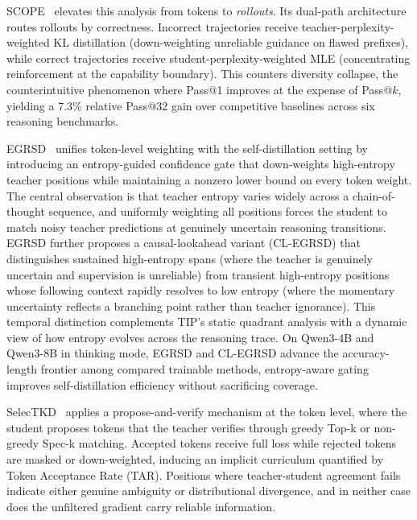 \documentclass{article} %
\begin{document}
SCOPE~\citep{2604.10688} elevates this analysis from tokens to \emph{rollouts}. Its dual-path architecture routes rollouts by correctness. Incorrect trajectories receive teacher-perplexity-weighted KL distillation (down-weighting unreliable guidance on flawed prefixes), while correct trajectories receive student-perplexity-weighted MLE (concentrating reinforcement at the capability boundary). This counters diversity collapse, the counterintuitive phenomenon where Pass@1 improves at the expense of Pass@$k$, yielding a 7.3\% relative Pass@32 gain over competitive baselines across six reasoning benchmarks.

EGRSD~\citep{2605.13255} unifies token-level weighting with the self-distillation setting by introducing an entropy-guided confidence gate that down-weights high-entropy teacher positions while maintaining a nonzero lower bound on every token weight. The central observation is that teacher entropy varies widely across a chain-of-thought sequence, and uniformly weighting all positions forces the student to match noisy teacher predictions at genuinely uncertain reasoning transitions. EGRSD further proposes a causal-lookahead variant (CL-EGRSD) that distinguishes sustained high-entropy spans (where the teacher is genuinely uncertain and supervision is unreliable) from transient high-entropy positions whose following context rapidly resolves to low entropy (where the momentary uncertainty reflects a branching point rather than teacher ignorance). This temporal distinction complements TIP's static quadrant analysis with a dynamic view of how entropy evolves across the reasoning trace. On Qwen3-4B and Qwen3-8B in thinking mode, EGRSD and CL-EGRSD advance the accuracy-length frontier among compared trainable methods, entropy-aware gating improves self-distillation efficiency without sacrificing coverage.

SelecTKD~\citep{2510.24021} applies a propose-and-verify mechanism at the token level, where the student proposes tokens that the teacher verifies through greedy Top-k or non-greedy Spec-k matching. Accepted tokens receive full loss while rejected tokens are masked or down-weighted, inducing an implicit curriculum quantified by Token Acceptance Rate (TAR). Positions where teacher-student agreement fails indicate either genuine ambiguity or distributional divergence, and in neither case does the unfiltered gradient carry reliable information.
\end{document}
